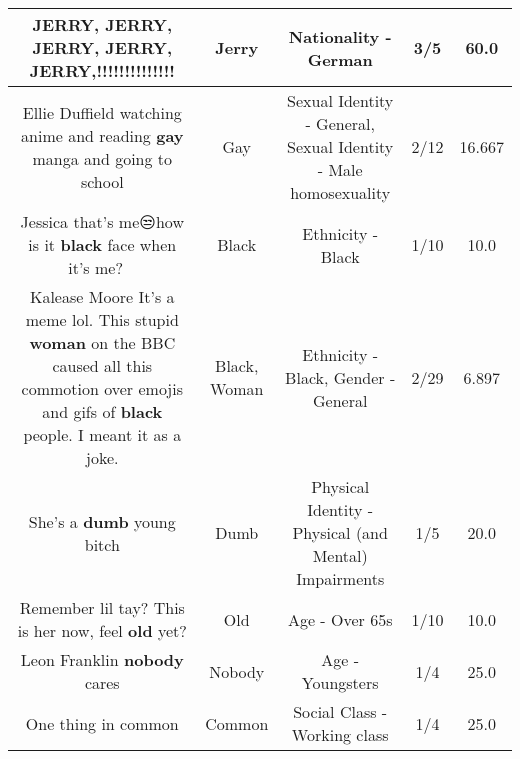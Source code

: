 \documentclass[11pt]{article}
\newlength\mylength
\begin{document}
\begin{center}
\begin{longtable}{|C{.65\mylength}|C{.30\mylength}|C{.12\mylength}|C{.12\mylength}|C{.12\mylength}|}
  \small JERRY, \textbf{JERRY}, \textbf{JERRY}, \textbf{JERRY}, \textbf{JERRY},!!!!!!!!!!!!!!\normalsize   & Jerry & Nationality - German & 3/5 & 60.0 \\  \hline
  \small Ellie Duffield watching anime and reading \textbf{g\textbf{ay}} manga and going to school\normalsize   & Gay & Sexual Identity - General, Sexual Identity - Male homosexuality & 2/12 & 16.667 \\  \hline
  \small Jessica that's me😒how is it \textbf{black} face when it's me?🤷🏾‍♂️\normalsize   & Black & Ethnicity - Black & 1/10 & 10.0 \\  \hline
  \small Kalease Moore It's a meme lol. This stupid \textbf{woman} on the BBC caused all this commotion over emojis and gifs of \textbf{black} people. I meant it as a joke.\normalsize   & Black, Woman & Ethnicity - Black, Gender - General & 2/29 & 6.897 \\  \hline
  \small She's a \textbf{dumb} young bitch\normalsize   & Dumb & Physical Identity - Physical (and Mental) Impairments & 1/5 & 20.0 \\  \hline
  \small Remember lil tay? This is her now, feel \textbf{old} yet?\normalsize   & Old & Age - Over 65s & 1/10 & 10.0 \\  \hline
  \small Leon Franklin \textbf{nobody} cares\normalsize   & Nobody & Age - Youngsters & 1/4 & 25.0 \\  \hline
  \small One thing in common\normalsize   & Common & Social Class - Working class & 1/4 & 25.0 \\  \hline
  
\end{longtable}
\end{center}
\end{document}
